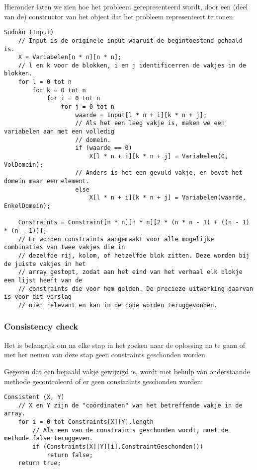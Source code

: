 \documentclass[]{report}
\begin{document}
Hieronder laten we zien hoe het probleem gerepresenteerd wordt, door een (deel van de) constructor van het object dat het probleem representeert te tonen.

\begin{minipage}{\textwidth}
\begin{lstlisting}
Sudoku (Input)
	// Input is de originele input waaruit de begintoestand gehaald is.
	X = Variabelen[n * n][n * n];
	// l en k voor de blokken, i en j identificerren de vakjes in de blokken.
	for l = 0 tot n
		for k = 0 tot n
			for i = 0 tot n
				for j = 0 tot n
					waarde = Input[l * n + i][k * n + j];
					// Als het een leeg vakje is, maken we een variabelen aan met een volledig
					// domein.
					if (waarde == 0)
						X[l * n + i][k * n + j] = Variabelen(0, VolDomein);
					// Anders is het een gevuld vakje, en bevat het domein maar een element.
					else
						X[l * n + i][k * n + j] = Variabelen(waarde, EnkelDomein);
						
	Constraints = Constraint[n * n][n * n][2 * (n * n - 1) + ((n - 1) * (n - 1))];
	// Er worden constraints aangemaakt voor alle mogelijke combinaties van twee vakjes die in 
	// dezelfde rij, kolom, of hetzelfde blok zitten. Deze worden bij de juiste vakjes in het 
	// array gestopt, zodat aan het eind van het verhaal elk blokje een lijst heeft van de 
	// constraints die voor hem gelden. De precieze uitwerking daarvan is voor dit verslag 
	// niet relevant en kan in de code worden teruggevonden.
\end{lstlisting}
\end{minipage}

\subsubsection{Consistency check}
Het is belangrijk om na elke stap in het zoeken naar de oplossing na te gaan of met het nemen van deze stap geen constraints geschonden worden.

Gegeven dat een bepaald vakje gewijzigd is, wordt met behulp van onderstaande methode gecontroleerd of er geen constraints geschonden worden:

\begin{minipage}{\textwidth}
\begin{lstlisting}
Consistent (X, Y)
	// X en Y zijn de "coördinaten" van het betreffende vakje in de array.
	for i = 0 tot Constraints[X][Y].length
		// Als een van de constraints geschonden wordt, moet de methode false teruggeven.
		if (Constraints[X][Y][i].ConstraintGeschonden())
			return false;
	return true;
\end{lstlisting}
\end{minipage}
\end{document}
